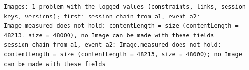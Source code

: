 \begin{lstlisting}[language={},basicstyle=\ttfamily\footnotesize,breaklines=true]
Images: 1 problem with the logged values (constraints, links, session keys, versions); first: session chain from a1, event a2: Image.measured does not hold: contentLength = size (contentLength = 48213, size = 48000); no Image can be made with these fields
session chain from a1, event a2: Image.measured does not hold: contentLength = size (contentLength = 48213, size = 48000); no Image can be made with these fields
\end{lstlisting}
